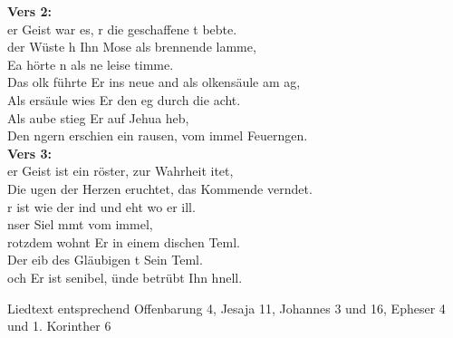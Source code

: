 \textbf{Vers 2:}\\
er Geist war es, r die geschaffene t bebte.\\
 der Wüste h Ihn Mose als brennende lamme,\\
Ea hörte n als ne leise timme.\\
Das olk führte Er ins neue and als olkensäule am ag,\\
Als ersäule wies Er den eg durch die acht.\\
Als aube stieg Er auf Jehua heb,\\
Den ngern erschien ein rausen, vom immel Feuerngen.\\

\textbf{Vers 3:}\\
er Geist ist ein röster,  zur Wahrheit itet,\\
Die ugen der Herzen eruchtet, das Kommende verndet.\\
r ist wie der ind und eht wo er ill.\\
nser Siel mmt vom immel,\\
rotzdem wohnt Er in einem dischen Teml.\\
Der eib des Gläubigen t Sein Teml.\\
och Er ist senibel, ünde betrübt Ihn hnell.\\

\begin{footnotesize}
Liedtext entsprechend Offenbarung 4, Jesaja 11, Johannes 3 und 16, Epheser 4 und 1. Korinther 6
\end{footnotesize}